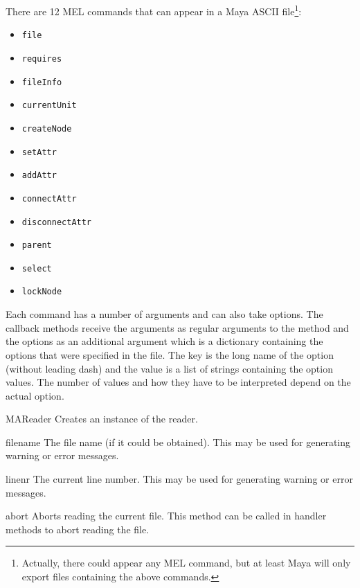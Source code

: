There are 12 MEL commands that can appear in a Maya ASCII 
file\footnote{Actually, there could appear any MEL command, but at least
Maya will only export files containing the above commands.}:

\begin{itemize}
\item {\tt file}
\item {\tt requires}
\item {\tt fileInfo}
\item {\tt currentUnit}
\item {\tt createNode}
\item {\tt setAttr}
\item {\tt addAttr}
\item {\tt connectAttr}
\item {\tt disconnectAttr}
\item {\tt parent}
\item {\tt select}
\item {\tt lockNode}
\end{itemize}

Each command has a number of arguments and can also take options. The
callback methods receive the arguments as regular arguments to the
method and the options as an additional argument  which is
a dictionary containing the options that were specified in the
file. The key is the long name of the option (without leading dash)
and the value is a list of strings containing the option values.  The
number of values and how they have to be interpreted depend on the
actual option.

\begin{classdesc}{MAReader}{}
  Creates an instance of the reader.
\end{classdesc}

\begin{memberdesc}{filename}
The file name (if it could be obtained). This may be used for generating
warning or error messages.
\end{memberdesc}

\begin{memberdesc}{linenr}
The current line number. This may be used for generating warning or error
messages.
\end{memberdesc}

\begin{methoddesc}{abort}{}
Aborts reading the current file.
This method can be called in handler methods to abort reading the file.
\end{methoddesc}

